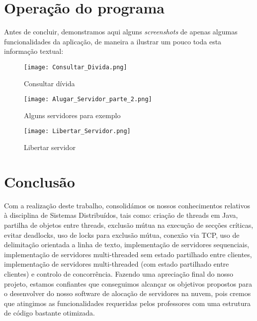 \documentclass[11pt]{article}
\begin{document}
\section{Operação do programa}
Antes de concluir, demonstramos aqui alguns \emph{screenshots} de apenas algumas funcionalidades da aplicação, de maneira a ilustrar um pouco toda esta informação textual:

\begin{figure}[h]
    \centering
    \texttt{[image: Consultar\_Divida.png]}
    \caption{Consultar dívida}
    \label{fig:consultar_divida}
\end{figure}

\begin{figure}[h]
    \centering
    \texttt{[image: Alugar\_Servidor\_parte\_2.png]}
    \caption{Alguns servidores para exemplo}
    \label{fig:exemplo_tipos_servidores}
\end{figure}

\begin{figure}[h]
    \centering
    \texttt{[image: Libertar\_Servidor.png]}
    \caption{Libertar servidor}
    \label{fig:libertar_servidor}
\end{figure}

\newpage
\section{Conclusão}

Com a realização deste trabalho, consolidámos os nossos conhecimentos relativos à disciplina de Sistemas Distribuídos, tais como: criação de threads em Java, partilha de objetos entre threads, exclusão mútua na execução de secções críticas, evitar deadlocks, uso de locks para exclusão mútua, conexão via TCP, uso de delimitação orientada a linha de texto, implementação de servidores sequenciais, implementação de servidores multi-threaded sem estado partilhado entre clientes, implementação de servidores multi-threaded (com estado partilhado entre clientes) e controlo de concorrência. Fazendo uma apreciação final do nosso projeto, estamos confiantes que conseguimos alcançar os objetivos propostos para o desenvolver do nosso software de alocação de servidores na nuvem, pois cremos que atingimos as funcionalidades requeridas pelos professores com uma estrutura de código bastante otimizada.
\end{document}
